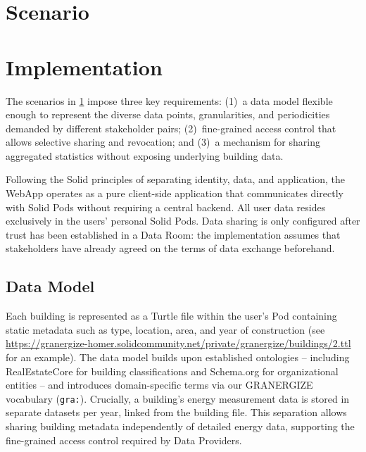 \documentclass[
]{ceurart}
\begin{document}
\section{Scenario}
\label{sec:scenario}



\section{Implementation}

The scenarios in \cref{sec:scenario} impose three key requirements: (1)~a data model flexible enough to represent the diverse data points, granularities, and periodicities demanded by different stakeholder pairs; (2)~fine-grained access control that allows selective sharing and revocation; and (3)~a mechanism for sharing aggregated statistics without exposing underlying building data.

Following the Solid principles of separating identity, data, and application, the WebApp operates as a pure client-side application that communicates directly with Solid Pods without requiring a central backend.
All user data resides exclusively in the users' personal Solid Pods.
Data sharing is only configured after trust has been established in a Data Room: the implementation assumes that stakeholders have already agreed on the terms of data exchange beforehand.

\subsection{Data Model}

Each building is represented as a Turtle file within the user's Pod containing static metadata such as type, location, area, and year of construction (see \url{https://granergize-homer.solidcommunity.net/private/granergize/buildings/2.ttl} for an example).
The data model builds upon established ontologies -- including RealEstateCore for building classifications and Schema.org for organizational entities -- and introduces domain-specific terms via our GRANERGIZE vocabulary (\texttt{gra:}).
Crucially, a building's energy measurement data is stored in separate datasets per year, linked from the building file.
This separation allows sharing building metadata independently of detailed energy data, supporting the fine-grained access control required by Data Providers.
\end{document}
